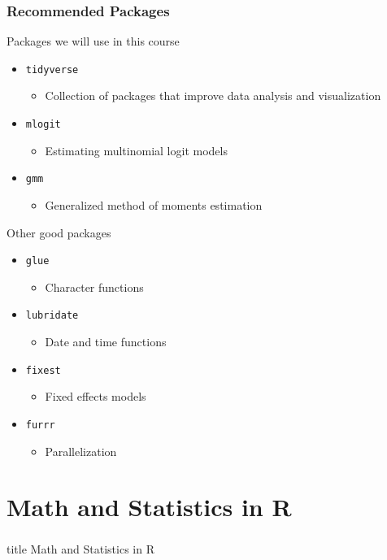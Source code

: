 \documentclass{beamer}
\begin{document}
\begin{frame}\frametitle{Recommended Packages}
    Packages we will use in this course
    \begin{itemize}
        \item \texttt{tidyverse}
        \begin{itemize}
            \item Collection of packages that improve data analysis and visualization
        \end{itemize}
        \item \texttt{mlogit}
        \begin{itemize}
            \item Estimating multinomial logit models
        \end{itemize}
        \item \texttt{gmm}
        \begin{itemize}
            \item Generalized method of moments estimation
        \end{itemize}
    \end{itemize}
    \vspace{0.5ex}
    Other good packages
    \begin{itemize}
        \item \texttt{glue}
        \begin{itemize}
            \item Character functions
        \end{itemize}
        \item \texttt{lubridate}
        \begin{itemize}
            \item Date and time functions
        \end{itemize}
        \item \texttt{fixest}
        \begin{itemize}
            \item Fixed effects models
        \end{itemize}
        \item \texttt{furrr}
        \begin{itemize}
            \item Parallelization
        \end{itemize}
    \end{itemize}
\end{frame}

\section{Math and Statistics in R}
\label{math}
\begin{frame}\frametitle{}
    \vfill
    \centering
    \begin{beamercolorbox}[center]{title}
        \Large Math and Statistics in R
    \end{beamercolorbox}
    \vfill
\end{frame}
\end{document}
